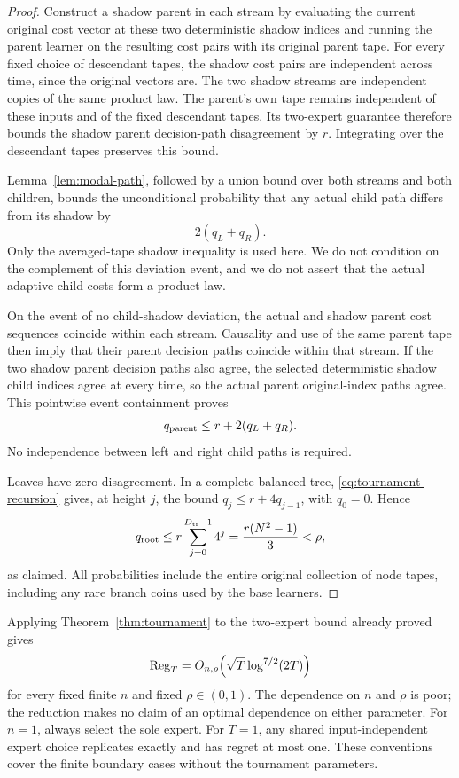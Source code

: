 \begin{proof}
Construct a shadow parent in each stream by evaluating the current
original cost vector at these two deterministic shadow indices and
running the parent learner on the resulting cost pairs with its original
parent tape. For every fixed choice of descendant tapes, the shadow
cost pairs are independent across time, since the original vectors are.
The two shadow streams are independent copies of the same product law.
The parent's own tape remains independent of these inputs and of the
fixed descendant tapes. Its two-expert guarantee therefore bounds the
shadow parent decision-path disagreement by $r$. Integrating over the
descendant tapes preserves this bound.

Lemma~\ref{lem:modal-path}, followed by a union bound over both streams
and both children, bounds the unconditional probability that any actual
child path differs from its shadow by
\[
 2(q_L+q_R).
\]
Only the averaged-tape shadow inequality is used here. We do not
condition on the complement of this deviation event, and we do not
assert that the actual adaptive child costs form a product law.

On the event of no child-shadow deviation, the actual and shadow parent
cost sequences coincide within each stream. Causality and use of the
same parent tape then imply that their parent decision paths coincide
within that stream. If the two shadow parent decision paths also agree,
the selected deterministic shadow child indices agree at every time,
so the actual parent original-index paths agree. This pointwise event
containment proves
\begin{equation}
 q_{\rm parent}\le r+2(q_L+q_R).
 \label{eq:tournament-recursion}
\end{equation}
No independence between left and right child paths is required.

Leaves have zero disagreement. In a complete balanced tree,
\eqref{eq:tournament-recursion} gives, at height $j$, the bound
$q_j\le r+4q_{j-1}$, with $q_0=0$. Hence
\[
 q_{\rm root}\le r\sum_{j=0}^{D_{\rm tr}-1}4^j
   =\frac{r(N^2-1)}{3}<\rho,
\]
as claimed. All probabilities include the entire original collection
of node tapes, including any rare branch coins used by the base
learners.
\end{proof}

Applying Theorem~\ref{thm:tournament} to the two-expert bound already
proved gives
\[
 \operatorname{Reg}_T=O_{n,\rho}\!\left(\sqrt T\log^{7/2}(2T)\right)
\]
for every fixed finite $n$ and fixed $\rho\in(0,1)$. The dependence on
$n$ and $\rho$ is poor; the reduction makes no claim of an optimal
dependence on either parameter. For $n=1$, always select the sole expert.
For $T=1$, any shared input-independent expert choice replicates exactly
and has regret at most one. These conventions cover the finite boundary
cases without the tournament parameters.
